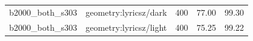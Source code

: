 \begin{longtable}{l>{\raggedright\arraybackslash}p{.42\linewidth}rrr}
b2000\_\allowbreak{}both\_\allowbreak{}s303 & %
geometry:lyricsz/dark & %
400 & %
77.00 & %
99.30 \\ %

b2000\_\allowbreak{}both\_\allowbreak{}s303 & %
geometry:lyricsz/light & %
400 & %
75.25 & %
99.22 \\ %


\end{longtable}
